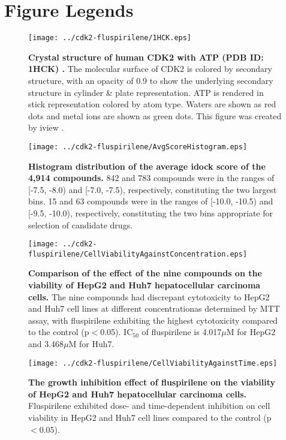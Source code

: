 \documentclass[10pt]{article}
\begin{document}
\section*{Figure Legends}

\begin{figure}
\begin{center}
\texttt{[image: ../cdk2-fluspirilene/1HCK.eps]}
\end{center}
\caption{
{\bf Crystal structure of human CDK2 with ATP (PDB ID: 1HCK) \cite{1142}.} The molecular surface of CDK2 is colored by secondary structure, with an opacity of 0.9 to show the underlying secondary structure in cylinder \& plate representation. ATP is rendered in stick representation colored by atom type. Waters are shown as red dots and metal ions are shown as green dots. This figure was created by iview \cite{1366}.
}
\label{1HCK}
\end{figure}

\begin{figure}
\begin{center}
\texttt{[image: ../cdk2-fluspirilene/AvgScoreHistogram.eps]}
\end{center}
\caption{
{\bf Histogram distribution of the average idock score of the 4,914 compounds.} 842 and 783 compounds were in the ranges of [-7.5, -8.0) and [-7.0, -7.5), respectively, constituting the two largest bins. 15 and 63 compounds were in the ranges of [-10.0, -10.5) and [-9.5, -10.0), respectively, constituting the two bins appropriate for selection of candidate drugs.
}
\label{AvgScoreHistogram}
\end{figure}

\begin{figure}
\begin{center}
\texttt{[image: ../cdk2-fluspirilene/CellViabilityAgainstConcentration.eps]}
\end{center}
\caption{
{\bf Comparison of the effect of the nine compounds on the viability of HepG2 and Huh7 hepatocellular carcinoma cells.} The nine compounds had discrepant cytotoxicity to HepG2 and Huh7 cell lines at different concentrationas determined by MTT assay, with fluspirilene exhibiting the highest cytotoxicity compared to the control (p$<$0.05). IC$_{50}$ of fluspirilene is 4.017$\mu$M for HepG2 and 3.468$\mu$M for Huh7.
}
\label{CellViabilityAgainstConcentration}
\end{figure}

\begin{figure}
\begin{center}
\texttt{[image: ../cdk2-fluspirilene/CellViabilityAgainstTime.eps]}
\end{center}
\caption{
{\bf The growth inhibition effect of fluspirilene on the viability of HepG2 and Huh7 hepatocellular carcinoma cells.} Fluspirilene exhibited dose- and time-dependent inhibition on cell viability in HepG2 and Huh7 cell lines compared to the control (p$<$0.05).
}
\label{CellViabilityAgainstTime}
\end{figure}
\end{document}
